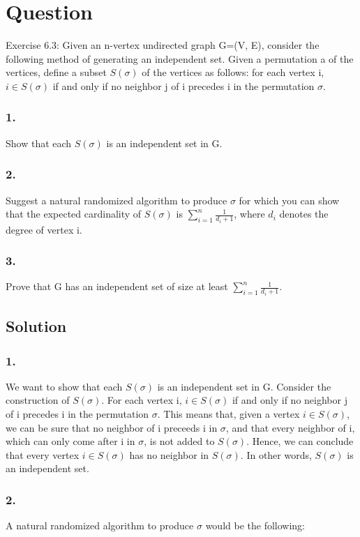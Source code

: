 \documentclass[10pt]{article}
\begin{document}
\section{Question}
Exercise 6.3: Given an n-vertex undirected graph G=(V, E), consider the following method of generating an independent set. Given a permutation a of the vertices, define a subset $S(\sigma)$ of the vertices as follows: for each vertex i, $i\in S(\sigma)$ if and only if no neighbor j of i precedes i in the permutation $\sigma$.

\subsubsection{1.} Show that each $S(\sigma)$ is an independent set in G.
\subsubsection{2.} Suggest a natural randomized algorithm to produce $\sigma$ for which you can show that the expected cardinality of $S(\sigma)$ is $\sum_{i=1}^{n}\frac{1}{d_{i}+1}$, where $d_{i}$ denotes the degree of vertex i.
\subsubsection{3.} Prove that G has an independent set of size at least $\sum_{i=1}^{n}\frac{1}{d_{i}+1}$.

\subsection{Solution}
\subsubsection{1.} We want to show that each $S(\sigma)$ is an independent set in G. Consider the construction of $S(\sigma)$. For each vertex i, $i\in S(\sigma)$ if and only if no neighbor j of i precedes i in the permutation $\sigma$. This means that, given a vertex $i \in S(\sigma)$, we can be sure that no neighbor of i preceeds i in $\sigma$, and that every neighbor of i, which can only come after i in $\sigma$, is not added to $S(\sigma)$. Hence, we can conclude that every vertex $i\in S(\sigma)$ has no neighbor in $S(\sigma)$. In other words, $S(\sigma)$ is an independent set.

\subsubsection{2.} A natural randomized algorithm to produce $\sigma$ would be the following:
\end{document}

